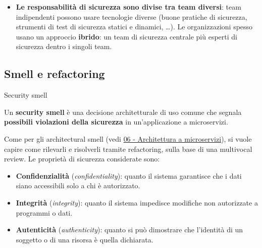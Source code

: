 \begin{itemize}
  \textbf{La distribuzione rende difficile condividere il contesto
  utente}: a una richiesta che si muove nel sistema si vogliono
  associare molte informazioni (es. se è una richiesta premium o no). Il
  problema è far sì che il microservizio che riceve si fidi del contesto
  utente passato da chi chiama (se qualcuno lo manipola, è un attacco).
  Una soluzione diffusa è il \textbf{JSON Web Token (JWT)}, un token di
  sicurezza per condividere il contesto utente tra microservizi.
\item
  \textbf{Le responsabilità di sicurezza sono divise tra team diversi}:
  team indipendenti possono usare tecnologie diverse (buone pratiche di
  sicurezza, strumenti di test di sicurezza statici e dinamici, \ldots).
  Le organizzazioni spesso usano un approccio \textbf{ibrido}: un team
  di sicurezza centrale più esperti di sicurezza dentro i singoli team.
\end{itemize}

\subsection{Smell e refactoring}\label{smell-e-refactoring}

\begin{boxdefinition}{Security smell}

Un \textbf{security smell} è una decisione architetturale di uso comune
che segnala \textbf{possibili violazioni della sicurezza} in
un'applicazione a microservizi.

\end{boxdefinition}

Come per gli architectural smell (vedi
\href{06\%20-\%20Architettura\%20a\%20microservizi}{06 - Architettura a
microservizi}), si vuole capire come rilevarli e risolverli tramite
refactoring, sulla base di una multivocal review. Le proprietà di
sicurezza considerate sono:

\begin{itemize}
\tightlist
\item
  \textbf{Confidenzialità} (\emph{confidentiality}): quanto il sistema
  garantisce che i dati siano accessibili solo a chi è autorizzato.
\item
  \textbf{Integrità} (\emph{integrity}): quanto il sistema impedisce
  modifiche non autorizzate a programmi o dati.
\item
  \textbf{Autenticità} (\emph{authenticity}): quanto si può dimostrare
  che l'identità di un soggetto o di una risorsa è quella dichiarata.
\end{itemize}

